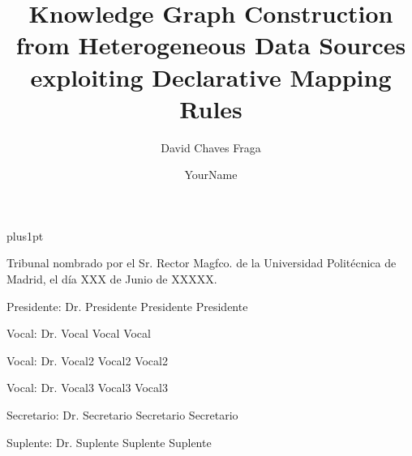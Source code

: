 \documentclass[twoside,11pt,table,xcdraw]{Latex/Classes/PhDthesisPSnPDF}
\title{Knowledge Graph Construction from Heterogeneous Data Sources exploiting Declarative Mapping Rules}
\author{{\hspace{7mm} David Chaves Fraga}}
\author{YourName}
\begin{document}

\renewcommand\baselinestretch{1.2}
\baselineskip=18pt plus1pt

\theoremstyle{plain}
\newtheorem{thm}{Theorem}[chapter] %


\theoremstyle{definition}
\newtheorem{definition}[thm]{Definition} %

\newcommand{\attention}[1]{{\color{red}\textbf{#1}}}

\renewcommand\appendixname{ANNEX}


\frontmatter
\maketitle  %




\pagestyle{plain}
\cleardoublepage
\pagestyle{plain}


\noindent Tribunal nombrado por el Sr. Rector Magfco. de la Universidad Polit\'{e}cnica de
Madrid, el d\'{i}a XXX de Junio de XXXXX. %

\vspace{10mm}
Presidente:\hspace{0.3mm} Dr. Presidente Presidente Presidente

\vspace{5mm}
Vocal: \hspace{6.7mm} Dr. Vocal Vocal Vocal 

\vspace{5mm}
Vocal: \hspace{6.7mm} Dr. Vocal2 Vocal2 Vocal2

\vspace{5mm}
Vocal: \hspace{6.7mm} Dr. Vocal3 Vocal3 Vocal3

\vspace{5mm}
Secretario:\hspace{0.67mm} Dr. Secretario Secretario Secretario

\vspace{5mm}
Suplente: \hspace{1.5mm} Dr. Suplente Suplente Suplente   
\end{document}
